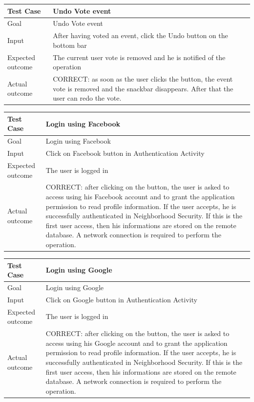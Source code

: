 \documentclass[a4paper]{scrreprt}
\begin{document}
\bigskip
\noindent
\begin{tabularx}{\linewidth}{|l|X|}
	\hline
	\textbf{Test Case} 	& \textbf{Undo Vote event} \\ \hline
	Goal 				& Undo Vote event \\ \hline
	Input 				& After having voted an event, click the Undo button on the bottom bar \\ \hline
	Expected outcome 	& The current user vote is removed and he is notified of the operation \\ \hline
	Actual outcome 		& CORRECT: as soon as the user clicks the button, the event vote is removed and the snackbar disappears. After that the user can redo the vote. \\ \hline
\end{tabularx}
\bigskip
\noindent
\begin{tabularx}{\linewidth}{|l|X|}
	\hline
	\textbf{Test Case} 	& \textbf{Login using Facebook} \\ \hline
	Goal 				& Login using Facebook \\ \hline
	Input 				& Click on Facebook button in Authentication Activity \\ \hline
	Expected outcome 	& The user is logged in \\ \hline
	Actual outcome 		& CORRECT: after clicking on the button, the user is asked to access using his Facebook account and to grant the application permission to read profile information. If the user accepts, he is successfully authenticated in Neighborhood Security. If this is the first user access, then his informations are stored on the remote database.  A network connection is required to perform the operation. \\ \hline
\end{tabularx}
\bigskip
\noindent
\begin{tabularx}{\linewidth}{|l|X|}
	\hline
	\textbf{Test Case} 	& \textbf{Login using Google} \\ \hline
	Goal 				& Login using Google \\ \hline
	Input 				& Click on Google button in Authentication Activity \\ \hline
	Expected outcome 	& The user is logged in \\ \hline
	Actual outcome 		& CORRECT: after clicking on the button, the user is asked to access using his Google account and to grant the application permission to read profile information. If the user accepts, he is successfully authenticated in Neighborhood Security. If this is the first user access, then his informations are stored on the remote database. A network connection is required to perform the operation. \\ \hline
\end{tabularx}
\end{document}

